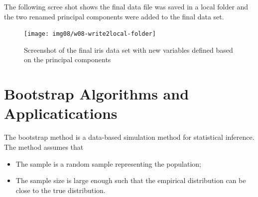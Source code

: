 \documentclass[
]{book}
\newenvironment{Shaded}{\begin{snugshade}}{\end{snugshade}}
\newcommand{\CommentTok}[1]{\textcolor[rgb]{0.56,0.35,0.01}{\textit{#1}}}
\newcommand{\DecValTok}[1]{\textcolor[rgb]{0.00,0.00,0.81}{#1}}
\newcommand{\DocumentationTok}[1]{\textcolor[rgb]{0.56,0.35,0.01}{\textbf{\textit{#1}}}}
\newcommand{\NormalTok}[1]{#1}
\newcommand{\OtherTok}[1]{\textcolor[rgb]{0.56,0.35,0.01}{#1}}
\newcommand{\SpecialCharTok}[1]{\textcolor[rgb]{0.81,0.36,0.00}{\textbf{#1}}}
\begin{document}
\begin{Shaded}
\end{Shaded}

The following scree shot shows the final data file was saved in a local folder and the two renamed principal components were added to the final data set.

\begin{figure}

{\centering \texttt{[image: img08/w08-write2local-folder]} 

}

\caption{Screenshot of the final iris data set with new variables defined based on the principal components}\label{fig:unnamed-chunk-219}
\end{figure}

\hfill\break

\hypertarget{bootstrap-algorithms-and-applicatications}{%
\chapter{Bootstrap Algorithms and Applicatications}\label{bootstrap-algorithms-and-applicatications}}

The bootstrap method is a data-based simulation method for statistical inference. The method assumes that

\begin{itemize}
\item
  The sample is a random sample representing the population;
\item
  The sample size is large enough such that the empirical distribution can be close to the true distribution.
\end{itemize}
\end{document}
